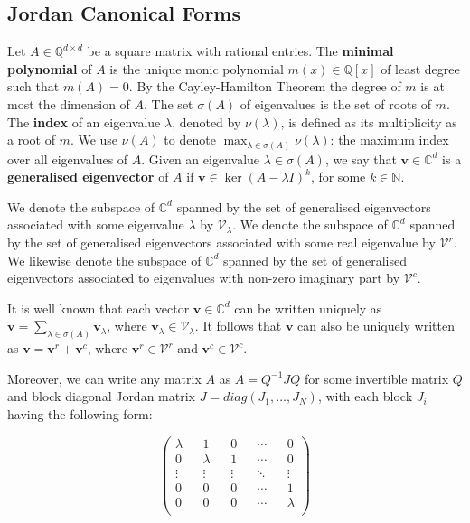 \subsection{Jordan Canonical Forms}

Let $A \in \mathbb{Q}^{d \times d}$ be a square matrix with rational
entries.  The \textbf{minimal polynomial} of $A$ is the unique monic
polynomial $m(x) \in \mathbb{Q}[x]$ of least degree such that
$m(A)=0$.  By the Cayley-Hamilton Theorem the degree of $m$ is at most
the dimension of $A$. The set $\sigma(A)$ of eigenvalues is the set of
roots of $m$.  The \textbf{index} of an eigenvalue $\lambda$, denoted
by $\nu(\lambda)$, is defined as its multiplicity as a root of $m$. We
use $\nu(A)$ to denote $\max_{\lambda\in\sigma(A)} \nu(\lambda)$: the
maximum index over all eigenvalues of $A$.  Given an eigenvalue
$\lambda \in \sigma(A)$, we say that $\boldsymbol{v} \in \mathbb{C}^d$
is a \textbf{generalised eigenvector} of $A$ if
$\boldsymbol{v}\in \ker(A-\lambda I)^{k}$, for some $k\in\mathbb{N}$.

We denote the subspace of $\mathbb{C}^d$ spanned by the set of
generalised eigenvectors associated with some eigenvalue $\lambda$ by
$\mathcal{V}_{\lambda}$. We denote the subspace of $\mathbb{C}^d$
spanned by the set of generalised eigenvectors associated with some
real eigenvalue by $\mathcal{V}^{r}$.  We likewise denote the subspace
of $\mathbb{C}^d$ spanned by the set of generalised eigenvectors
associated to eigenvalues with non-zero imaginary part by
$\mathcal{V}^{c}$.

It is well known that each vector $\boldsymbol{v}\in\mathbb{C}^{d}$
can be written uniquely as
$\boldsymbol{v}=\displaystyle{
  \sum\limits_{\lambda\in\sigma(A)}\boldsymbol{v}_{\lambda}}$,
where $\boldsymbol{v}_{\lambda}\in\mathcal{V}_{\lambda}$.
It follows that $\boldsymbol{v}$ can also be uniquely written as
$\boldsymbol{v}=\boldsymbol{v}^{r}+\boldsymbol{v}^{c}$, where
$\boldsymbol{v}^{r} \in\mathcal{V}^{r}$ and
$\boldsymbol{v}^{c} \in\mathcal{V}^{c}$.

Moreover, we can write any matrix $A$ as $A=Q^{-1}JQ$ for some
invertible matrix $Q$ and block diagonal Jordan matrix
$J=diag(J_{1},\ldots,J_{N})$, with each block $J_{i}$ having the
following form:

\begin{equation*}
\begin{pmatrix}
\lambda	&&	1		&&	0		&&	\cdots	&&	0		\\
0		&&	\lambda	&&	1		&&	\cdots	&&	0		\\
\vdots	&&	\vdots	&&	\vdots	&&	\ddots	&&	\vdots	\\
0		&&	0		&&	0		&&	\cdots	&&	1		\\
0		&&	0		&&	0		&&	\cdots	&&	\lambda	\\
\end{pmatrix}
\end{equation*}

